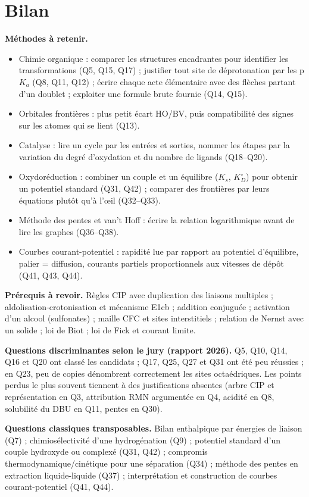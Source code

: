 \documentclass[11pt,a4paper]{article}
\providecommand{\tightlist}{\setlength{\itemsep}{0pt}\setlength{\parskip}{0pt}}
\begin{document}
\hypertarget{bilan}{%
\section{Bilan}\label{bilan}}

\textbf{Méthodes à retenir.}

\begin{itemize}
\tightlist
\item
  Chimie organique : comparer les structures encadrantes pour identifier les transformations (Q5, Q15, Q17) ; justifier tout site de déprotonation par les p\(K_a\) (Q8, Q11, Q12) ; écrire chaque acte élémentaire avec des flèches partant d'un doublet ; exploiter une formule brute fournie (Q14, Q15).
\item
  Orbitales frontières : plus petit écart HO/BV, puis compatibilité des signes sur les atomes qui se lient (Q13).
\item
  Catalyse : lire un cycle par les entrées et sorties, nommer les étapes par la variation du degré d'oxydation et du nombre de ligands (Q18--Q20).
\item
  Oxydoréduction : combiner un couple et un équilibre (\(K_s\), \(K_D^\circ\)) pour obtenir un potentiel standard (Q31, Q42) ; comparer des frontières par leurs équations plutôt qu'à l'œil (Q32--Q33).
\item
  Méthode des pentes et van't Hoff : écrire la relation logarithmique avant de lire les graphes (Q36--Q38).
\item
  Courbes courant-potentiel : rapidité lue par rapport au potentiel d'équilibre, palier = diffusion, courants partiels proportionnels aux vitesses de dépôt (Q41, Q43, Q44).
\end{itemize}

\textbf{Prérequis à revoir.} Règles CIP avec duplication des liaisons multiples ; aldolisation-\allowbreak{}crotonisation et mécanisme E1cb ; addition conjuguée ; activation d'un alcool (sulfonates) ; maille CFC et sites interstitiels ; relation de Nernst avec un solide ; loi de Biot ; loi de Fick et courant limite.

\textbf{Questions discriminantes selon le jury (rapport 2026).} Q5, Q10, Q14, Q16 et Q20 ont classé les candidats ; Q17, Q25, Q27 et Q31 ont été peu réussies ; en Q23, peu de copies dénombrent correctement les sites octaédriques. Les points perdus le plus souvent tiennent à des justifications absentes (arbre CIP et représentation en Q3, attribution RMN argumentée en Q4, acidité en Q8, solubilité du DBU en Q11, pentes en Q30).

\textbf{Questions classiques transposables.} Bilan enthalpique par énergies de liaison (Q7) ; chimiosélectivité d'une hydrogénation (Q9) ; potentiel standard d'un couple hydroxyde ou complexé (Q31, Q42) ; compromis thermodynamique/cinétique pour une séparation (Q34) ; méthode des pentes en extraction liquide-liquide (Q37) ; interprétation et construction de courbes courant-potentiel (Q41, Q44).
\end{document}
